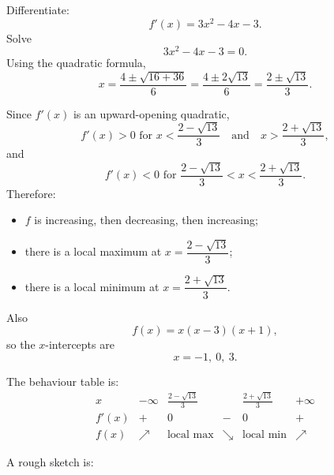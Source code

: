 \begin{solution}
Differentiate:
\[
f'(x)=3x^2-4x-3.
\]
Solve
\[
3x^2-4x-3=0.
\]
Using the quadratic formula,
\[
x=\frac{4\pm\sqrt{16+36}}{6}
=\frac{4\pm2\sqrt{13}}{6}
=\frac{2\pm\sqrt{13}}{3}.
\]

Since $f'(x)$ is an upward-opening quadratic,
\[
f'(x)>0 \text{ for } x<\frac{2-\sqrt{13}}{3}
\quad\text{and}\quad
x>\frac{2+\sqrt{13}}{3},
\]
and
\[
f'(x)<0 \text{ for } \frac{2-\sqrt{13}}{3}<x<\frac{2+\sqrt{13}}{3}.
\]
Therefore:
\begin{itemize}[leftmargin=*]
\item $f$ is increasing, then decreasing, then increasing;
\item there is a local maximum at $x=\dfrac{2-\sqrt{13}}{3}$;
\item there is a local minimum at $x=\dfrac{2+\sqrt{13}}{3}$.
\end{itemize}

Also
\[
f(x)=x(x-3)(x+1),
\]
so the $x$-intercepts are
\[
x=-1,\ 0,\ 3.
\]

The behaviour table is:
\[
\begin{array}{c|ccccc}
x & -\infty & \frac{2-\sqrt{13}}{3} &  & \frac{2+\sqrt{13}}{3} & +\infty\\ \hline
f'(x) & + & 0 & - & 0 & +\\ \hline
f(x) & \nearrow & \text{local max} & \searrow & \text{local min} & \nearrow
\end{array}
\]

A rough sketch is:
\begin{center}
\end{center}
\end{solution}

